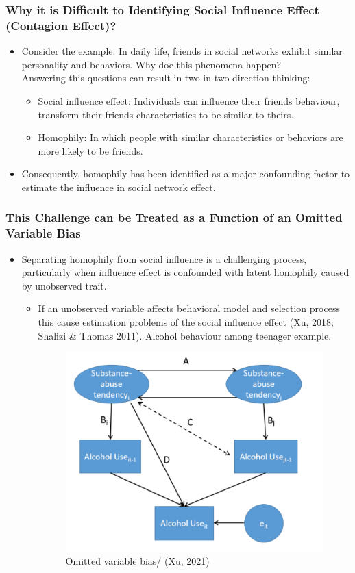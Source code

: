 \documentclass{beamer}
\begin{document}
\begin{frame}
\frametitle{Why it is Difficult to Identifying Social Influence Effect (Contagion Effect)? }
\begin{itemize}
\item Consider the example: In daily life, friends in social networks exhibit similar personality  and behaviors. Why doe this phenomena happen? \\
Answering this questions can result in two in two direction thinking:
\vspace{10 pt}
\begin{itemize}
\item Social influence effect: Individuals can influence their friends behaviour, transform their friends characteristics to be similar to theirs. 
\vspace{10pt}
\item Homophily: In which people with similar characteristics or behaviors are more likely to be friends. 
\end{itemize}
\vspace{10 pt}
\item Consequently, homophily has been identified as a major confounding factor to estimate the influence in social network effect. 

\end{itemize}
\end{frame}
\begin{frame}
\frametitle{This Challenge can be Treated  as  a Function of an Omitted Variable Bias }
\begin{itemize}
\item{Separating homophily from  social influence is
a challenging process, particularly when  influence effect  is confounded with latent homophily caused by unobserved trait.}
\vspace{10pt}
\begin{itemize}
    \item If an unobserved variable affects behavioral model and selection process this cause estimation problems of the social influence effect (Xu, 2018; Shalizi \& Thomas 2011). Alcohol behaviour among teenager example.
    \begin{figure}[h!]
  \centering
  \includegraphics[width=.4\linewidth]{rx.png}
  \caption{Omitted variable bias/  (Xu, 2021)}
  \label{fig:fig1}
\end{figure}
\end{itemize}
\end{itemize}
\end{frame}
\end{document}

